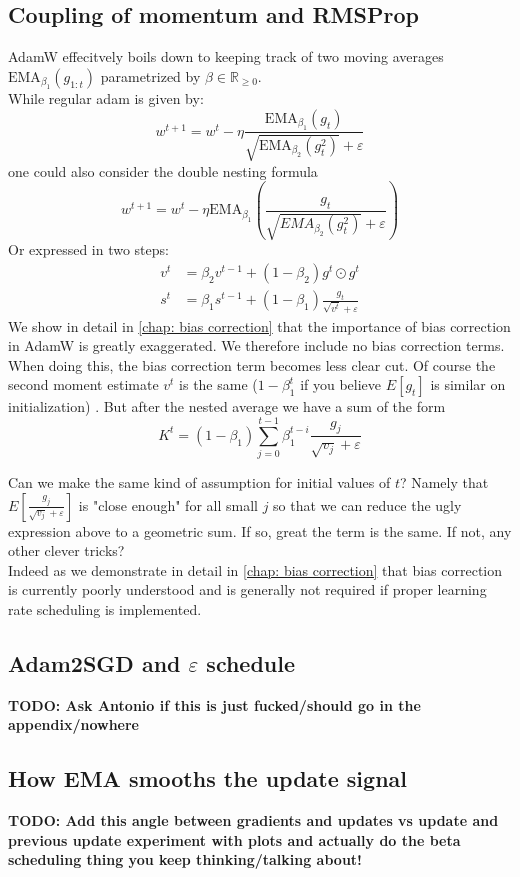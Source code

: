 \documentclass[12pt]{book}
\newcommand{\R}{\mathbb{R}}
\newcommand{\todo}[1]{{\color{red}\bf{TODO: #1}}}
\begin{document}
\subsection*{Coupling of momentum and RMSProp}
AdamW effecitvely boils down to keeping track of two moving averages $\text{EMA}_{\beta_1}(g_{1:t}) $  parametrized by $\beta\in \R_{\ge 0}$. 
\\
While regular adam is given by:
\[
w^{t+1} = w^{t} - \eta \frac{\text{EMA}_{\beta_1}(g_t)}{\sqrt{\text{EMA}_{\beta_2}(g_t ^2) } + \varepsilon  }
\] 
one could also consider the double nesting formula
\[
w^{t+1} = w^{t} - \eta \text{EMA}_{\beta_1} \left( \frac{g_t}{\sqrt{EMA_{\beta_2}(g_t^2)} + \varepsilon  } \right) 
\] 
Or expressed in two steps:
\begin{align*}
	v^{t} &= \beta_2v^{t-1} + (1-\beta_2)g^{t}\odot g^{t}\\
	s^{t} &= \beta_1s^{t-1} + (1-\beta_1) \frac{g_{t}}{\sqrt{v^{t}} + \varepsilon  }
\end{align*}
We show in detail in \ref{chap: bias correction} that the importance of bias correction in AdamW is greatly exaggerated. We therefore include no bias correction terms. 
When doing this, the bias correction term becomes less clear cut. Of course the second moment estimate $v^{t}$ is the same ($1-\beta_1^{t} $ if you believe $E[g_t]$ is similar on initialization) . But after the nested average we have a sum of the form 
\[
	K^{t} = (1-\beta_1)\sum_{j=0}^{t-1} {\beta_1^{t-i} \frac{g_j}{\sqrt{v_j} + \varepsilon }}
\]

Can we make the same kind of assumption for initial values of $t$? Namely that $E[\frac{g_j}{\sqrt{v_j} + \varepsilon }]$ is "close enough" for all small $j$ so that we can reduce the ugly expression above to a geometric sum. If so, great the term is the same. If not, any other clever tricks? 
\\
Indeed as we demonstrate in detail in \ref{chap: bias correction} that bias correction is currently poorly understood and is generally not required if proper learning rate scheduling is implemented. 

\subsection{Adam2SGD and $\varepsilon $ schedule}
\todo{Ask Antonio if this is just fucked/should go in the appendix/nowhere}
\subsection{How EMA smooths the update signal}
\todo{Add this angle between gradients and updates vs update and previous update experiment with plots and actually do the beta scheduling thing you keep thinking/talking about!}
\end{document}

